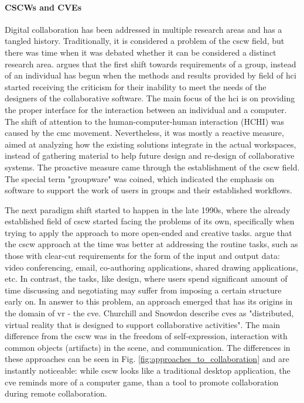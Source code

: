 


\paragraph[]{CSCWs and CVEs}
Digital collaboration has been addressed in multiple research areas and has a tangled history. Traditionally, it is considered a problem of the \gls{cscw} field, but there was time when it was debated whether it can be considered a distinct research area. \cite{bannon_perspectives_nodate} argues that the first shift towards requirements of a group, instead of an individual has begun when the methods and results provided by field of \gls{hci} started receiving the criticism for their inability to meet the needs of the designers of the collaborative software. The main focus of the \gls{hci} is on providing the proper interface for the interaction between an individual and a computer. The shift of attention to the human-computer-human interaction (HCHI) was caused by the \gls{cmc} movement. Nevertheless, it was mostly a reactive measure, aimed at analyzing how the existing solutions integrate in the actual workspaces, instead of gathering material to help future design and re-design of collaborative systems. The proactive measure came through the establishment of the \gls{cscw} field. The special term "groupware" was coined, which indicated the emphasis on software to support the work of users in groups and their established workflows.

The next paradigm shift started to happen in the late 1990s, where the already established field of \gls{cscw} started facing the problems of its own, specifically when trying to apply the approach to more open-ended and creative tasks. \cite{churchill_collaborative_1998} argue that the \gls{cscw} approach at the time was better at addressing the routine tasks, such as those with clear-cut requirements for the form of the input and output data: video conferencing, email, co-authoring applications, shared drawing applications, etc. In contrast, the tasks, like design, where users spend significant amount of time discussing and negotiating may suffer from imposing a certain structure early on. In answer to this problem, an approach emerged that has its origins in the domain of \gls{vr} - the \gls{cve}. Churchill and Snowdon describe \gls{cve}s as "distributed, virtual reality that is designed to support collaborative activities". The main difference from the \gls{cscw} was in the freedom of self-expression, interaction with common objects (artifacts) in the scene, and communication. The differences in these approaches can be seen in Fig. \ref{fig:approaches_to_collaboration} and are instantly noticeable: while \gls{cscw} looks like a traditional desktop application, the \gls{cve} reminds more of a computer game, than a tool to promote collaboration during remote collaboration. 

